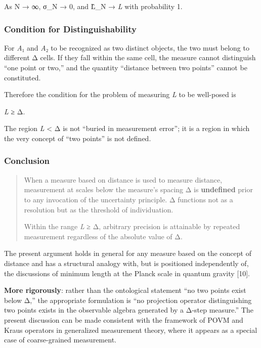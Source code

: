 \documentclass[
  11pt,
]{article}
\begin{document}
As N → ∞, σ\_N → 0, and L̂\_N → \emph{L} with probability 1.

\subsubsection{Condition for
Distinguishability}\label{condition-for-distinguishability}

For \emph{A}₁ and \emph{A}₂ to be recognized as two distinct objects,
the two must belong to different Δ cells. If they fall within the same
cell, the measure cannot distinguish ``one point or two,'' and the
quantity ``distance between two points'' cannot be constituted.

Therefore the condition for the problem of measuring \emph{L} to be
well-posed is

\emph{L} ≥ Δ.

The region \emph{L} \textless{} Δ is not ``buried in measurement
error''; it is a region in which the very concept of ``two points'' is
not defined.

\subsubsection{Conclusion}\label{conclusion}

\begin{quote}
When a measure based on distance is used to measure distance,
measurement at scales below the measure's spacing Δ is
\textbf{undefined} prior to any invocation of the uncertainty principle.
Δ functions not as a resolution but as the threshold of individuation.

Within the range \emph{L} ≥ Δ, arbitrary precision is attainable by
repeated measurement regardless of the absolute value of Δ.
\end{quote}

The present argument holds in general for any measure based on the
concept of distance and has a structural analogy with, but is positioned
independently of, the discussions of minimum length at the Planck scale
in quantum gravity {[}10{]}.

\textbf{More rigorously}: rather than the ontological statement ``no two
points exist below Δ,'' the appropriate formulation is ``no projection
operator distinguishing two points exists in the observable algebra
generated by a Δ-step measure.'' The present discussion can be made
consistent with the framework of POVM and Kraus operators in generalized
measurement theory, where it appears as a special case of coarse-grained
measurement.
\end{document}
